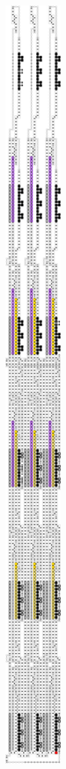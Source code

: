 \begin{figure}[H]
\begin{subfigure}[t]{0.3\textwidth}
        \includegraphics[width=0.3\textwidth]{full_overview_case3_colored}

\end{subfigure}
\end{figure}
